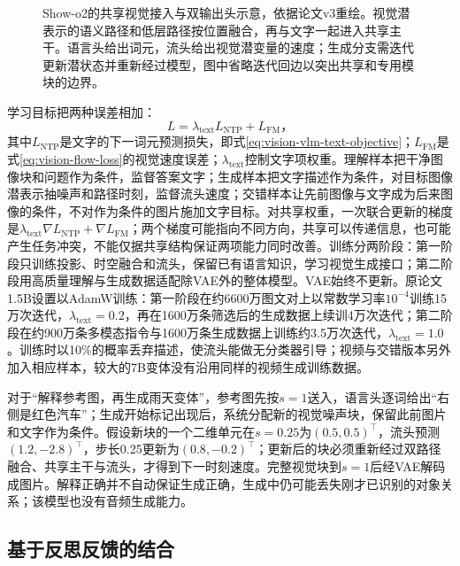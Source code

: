 \begin{figure}[tbp]
  \centering
  
  \caption{Show-o2的共享视觉接入与双输出头示意，依据论文v3重绘。视觉潜表示的语义路径和低层路径按位置融合，再与文字一起进入共享主干。语言头给出词元，流头给出视觉潜变量的速度；生成分支需迭代更新潜状态并重新经过模型，图中省略迭代回边以突出共享和专用模块的边界。}
  \label{fig:vision-showo-heads}
\end{figure}
\FloatBarrier

学习目标把两种误差相加：
\begin{equation}
  L=\lambda_{\mathrm{text}}L_{\mathrm{NTP}}+L_{\mathrm{FM}}\text{，}
  \label{eq:vision-showo-loss}
\end{equation}
其中$L_{\mathrm{NTP}}$是文字的下一词元预测损失，即式\eqref{eq:vision-vlm-text-objective}；$L_{\mathrm{FM}}$是式\eqref{eq:vision-flow-loss}的视觉速度误差；$\lambda_{\mathrm{text}}$控制文字项权重。理解样本把干净图像块和问题作为条件，监督答案文字；生成样本把文字描述作为条件，对目标图像潜表示抽噪声和路径时刻，监督流头速度；交错样本让先前图像与文字成为后来图像的条件，不对作为条件的图片施加文字目标。对共享权重，一次联合更新的梯度是$\lambda_{\mathrm{text}}\nabla L_{\mathrm{NTP}}+\nabla L_{\mathrm{FM}}$；两个梯度可能指向不同方向，共享可以传递信息，也可能产生任务冲突，不能仅据共享结构保证两项能力同时改善。训练分两阶段：第一阶段只训练投影、时空融合和流头，保留已有语言知识，学习视觉生成接口；第二阶段用高质量理解与生成数据适配除VAE外的整体模型。VAE始终不更新。原论文1.5B设置以AdamW训练：第一阶段在约6600万图文对上以常数学习率$10^{-4}$训练15万次迭代，$\lambda_{\mathrm{text}}=0.2$，再在1600万条筛选后的生成数据上续训4万次迭代；第二阶段在约900万条多模态指令与1600万条生成数据上训练约3.5万次迭代，$\lambda_{\mathrm{text}}=1.0$。训练时以10\%的概率丢弃描述，使流头能做无分类器引导；视频与交错版本另外加入相应样本，较大的7B变体没有沿用同样的视频生成训练数据。

对于“解释参考图，再生成雨天变体”，参考图先按$s=1$送入，语言头逐词给出“右侧是红色汽车”；生成开始标记出现后，系统分配新的视觉噪声块，保留此前图片和文字作为条件。假设新块的一个二维单元在$s=0.25$为$(0.5,0.5)^\top$，流头预测$(1.2,-2.8)^\top$，步长0.25更新为$(0.8,-0.2)^\top$；更新后的块必须重新经过双路径融合、共享主干与流头，才得到下一时刻速度。完整视觉块到$s=1$后经VAE解码成图片。解释正确并不自动保证生成正确，生成中仍可能丢失刚才已识别的对象关系；该模型也没有音频生成能力。

\subsection{基于反思反馈的结合}
\label{sec:vision-models-unireason}

